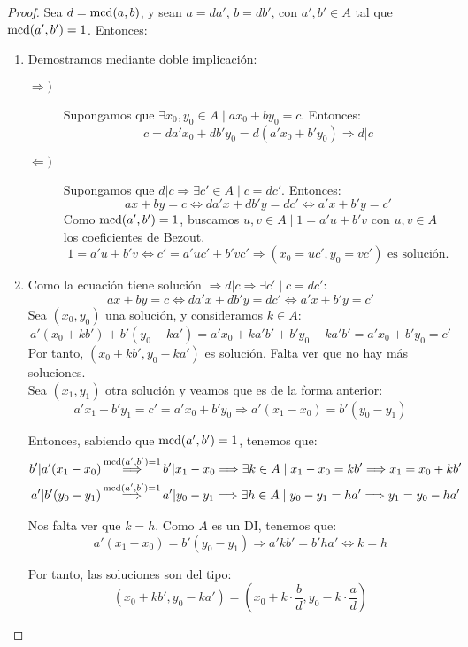 \begin{proof}
    Sea $d = \operatorname{mcd}(a,b)$, y sean $a = da'$, $b = db'$, con $a',b' \in A$ tal que $\operatorname{mcd}(a', b') = 1$. Entonces:
    \begin{enumerate} 
        \item Demostramos mediante doble implicación:
        \begin{description}
            \item[$\Longrightarrow)$] Supongamos que $\exists x_0, y_0 \in A \mid ax_0 + by_0 = c$. Entonces:
            $$c = da'x_0 + db'y_0 = d(a'x_0 + b'y_0) \Longrightarrow d|c$$

            \item[$\Longleftarrow)$] Supongamos que $d|c \Longrightarrow \exists c' \in A \mid c = dc'$. Entonces:
            $$ax+by=c \Longleftrightarrow da'x+db'y = dc' \Longleftrightarrow a'x+b'y=c'$$
            Como $\operatorname{mcd}(a',b')=1$, buscamos $u, v \in A \mid 1 = a'u + b'v$ con $u,v \in A$ los coeficientes de Bezout.
            $$1=a'u+b'v \Longleftrightarrow c' = a'uc' + b'vc' \Longrightarrow (x_0 = uc', y_0 = vc') \mbox{ es solución.}$$
        \end{description}

        \item Como la ecuación tiene solución $\Longrightarrow d|c \Longrightarrow \exists c' \mid c=dc'$:
        $$ax+by = c \Longleftrightarrow da'x + db'y = dc' \Longleftrightarrow a'x + b'y = c'$$
        Sea $(x_0, y_0)$ una solución, y consideramos $k \in A$:
        $$a'(x_0 + kb') + b'(y_0-ka') = a'x_0 + ka'b' + b' y_0 - ka'b' = a'x_0 + b'y_0 = c'$$
        Por tanto, $(x_0+kb', y_0-ka')$ es solución. Falta ver que no hay más soluciones.\\
            
        Sea $(x_1, y_1)$ otra solución y veamos que es de la forma anterior:
        $$a'x_1 + b'y_1 = c' = a'x_0 + b'y_0 \Longrightarrow a'(x_1-x_0) = b'(y_0-y_1)$$

        Entonces, sabiendo que $\operatorname{mcd}(a',b')=1$, tenemos que:
        \begin{gather*}
            b'|a'(x_1-x_0) \mathop{\Longrightarrow}^{\operatorname{mcd}(a',b')=1} b'|x_1-x_0 \Longrightarrow \exists k \in A \mid x_1 - x_0 = kb'
            \Longrightarrow x_1 = x_0 + kb' \\ a'|b'(y_0-y_1) \mathop{\Longrightarrow}^{\operatorname{mcd}(a',b')=1} a'|y_0-y_1 \Longrightarrow \exists h \in A \mid y_0 - y_1 = ha'
            \Longrightarrow y_1 = y_0 - ha'
        \end{gather*}
    
        Nos falta ver que $k=h$. Como $A$ es un DI, tenemos que: $$a'(x_1-x_0)=b'(y_0-y_1) \Longrightarrow a'kb' = b'ha' \Longleftrightarrow k = h$$

        Por tanto, las soluciones son del tipo:
        $$(x_0+kb', y_0-ka')=\left(x_0+k\cdot\dfrac{b}{d}, y_0-k\cdot\dfrac{a}{d}\right)$$
    \end{enumerate}
\end{proof}

